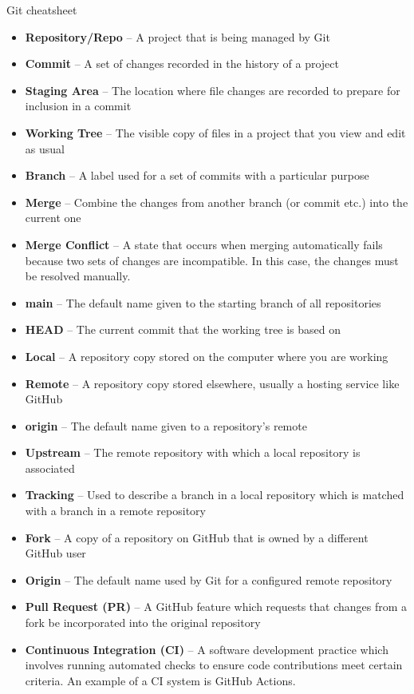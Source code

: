 \documentclass[9pt]{extarticle}
\def\itempad{-1pt}
\begin{document}
\thispagestyle{empty}

\begin{center}
  {\LARGE
  Git cheatsheet}
\end{center}

\begin{bluebox}[title=Glossary]
  \begin{itemize}
    \itemsep\itempad
    \item \textbf{Repository/Repo} -- A project that is being managed by Git
    \item \textbf{Commit} -- A set of changes recorded in the history of
      a project
    \item \textbf{Staging Area} -- The location where file changes are recorded to
      prepare for inclusion in a commit
    \item \textbf{Working Tree} -- The visible copy of files in a project that you view
      and edit as usual
    \item \textbf{Branch} -- A label used for a set of commits with a particular
      purpose
    \item \textbf{Merge} -- Combine the changes from another branch (or commit etc.)
      into the current one
    \item \textbf{Merge Conflict} -- A state that occurs when merging automatically
      fails because two sets of changes are incompatible. In this case, the changes must
      be resolved manually.
    \item \textbf{main} -- The default name given to the starting branch of all
      repositories
    \item \textbf{HEAD} -- The current commit that the working tree is based on
    \item \textbf{Local} -- A repository copy stored on the computer where you are
      working
    \item \textbf{Remote} -- A repository copy stored elsewhere, usually a hosting
      service like GitHub
    \item \textbf{origin} -- The default name given to a repository's remote
    \item \textbf{Upstream} -- The remote repository with which a local repository is
      associated
    \item \textbf{Tracking} -- Used to describe a branch in a local repository which is
      matched with a branch in a remote repository
    \item \textbf{Fork} -- A copy of a repository on GitHub that is owned by a different
      GitHub user
    \item \textbf{Origin} -- The default name used by Git for a configured remote
      repository
    \item \textbf{Pull Request (PR)} -- A GitHub feature which requests that changes from a
      fork be incorporated into the original repository
    \item \textbf{Continuous Integration (CI)} -- A software development practice which
      involves running automated checks to ensure code contributions meet certain
      criteria. An example of a CI system is GitHub Actions.
  \end{itemize}
\end{bluebox}
\end{document}

